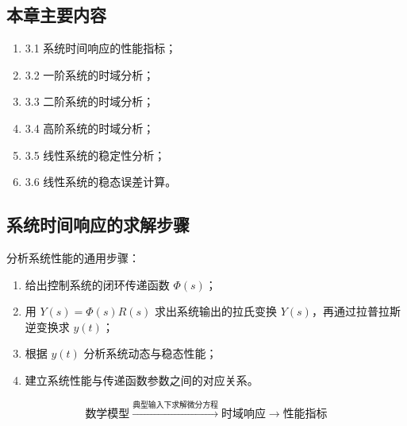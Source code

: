 \subsection{本章主要内容}
\begin{enumerate}
    \item 3.1 系统时间响应的性能指标；
    \item 3.2 一阶系统的时域分析；
    \item 3.3 二阶系统的时域分析；
    \item 3.4 高阶系统的时域分析；
    \item 3.5 线性系统的稳定性分析；
    \item 3.6 线性系统的稳态误差计算。
\end{enumerate}

\subsection{系统时间响应的求解步骤}
分析系统性能的通用步骤：
\begin{enumerate}
    \item 给出控制系统的闭环传递函数 $\Phi(s)$；
    \item 用 $Y(s) = \Phi(s)R(s)$ 求出系统输出的拉氏变换 $Y(s)$，再通过拉普拉斯逆变换求 $y(t)$；
    \item 根据 $y(t)$ 分析系统动态与稳态性能；
    \item 建立系统性能与传递函数参数之间的对应关系。
\end{enumerate}
\[
\text{数学模型} \xrightarrow{\text{典型输入下求解微分方程}} \text{时域响应} \rightarrow \text{性能指标}
\]

